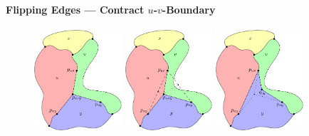 \documentclass[t,18pt]{beamer}
\newcommand{\emdash}{---}
\begin{document}
\begin{frame}[c]
  \frametitle{}
  \framesubtitle{Flipping Edges \emdash{} Contract $u$-$v$-Boundary}
  \begin{figure}
    \includegraphics[width=3.25cm]{../Thesis/Resources/FlipEdge-ContractBoundaryBelow-1.pdf}
    \quad
    \includegraphics[width=3.25cm]{../Thesis/Resources/FlipEdge-ContractBoundaryBelow-2.pdf}
    \quad
    \includegraphics[width=3.25cm]{../Thesis/Resources/FlipEdge-ContractBoundaryBelow-3.pdf}
  \end{figure}
\end{frame}
\end{document}
